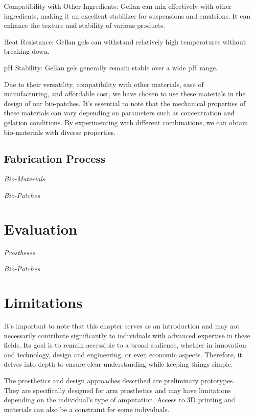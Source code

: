 \item Compatibility with Other Ingredients: Gellan can mix effectively with other ingredients, making it an excellent stabilizer for suspensions and emulsions. It can enhance the texture and stability of various products.

\item Heat Resistance: Gellan gels can withstand relatively high temperatures without breaking down.

\item pH Stability: Gellan gels generally remain stable over a wide pH range.

Due to their versatility, compatibility with other materials, ease of manufacturing, and affordable cost, we have chosen to use these materials in the design of our bio-patches. It's essential to note that the mechanical properties of these materials can vary depending on parameters such as concentration and gelation conditions. By experimenting with different combinations, we can obtain bio-materials with diverse properties.

\subsection{Fabrication Process}
\textit{Bio-Materials}

\textit{Bio-Patches}

\section{Evaluation}


\textit{Prostheses}

\textit{Bio-Patches}

\section{Limitations}
It's important to note that this chapter serves as an introduction and may not necessarily contribute significantly to individuals with advanced expertise in these fields. Its goal is to remain accessible to a broad audience, whether in innovation and technology, design and engineering, or even economic aspects. Therefore, it delves into depth to ensure clear understanding while keeping things simple. 

The prosthetics and design approaches described are preliminary prototypes. They are specifically designed for arm prosthetics and may have limitations depending on the individual's type of amputation. Access to 3D printing and materials can also be a constraint for some individuals.

